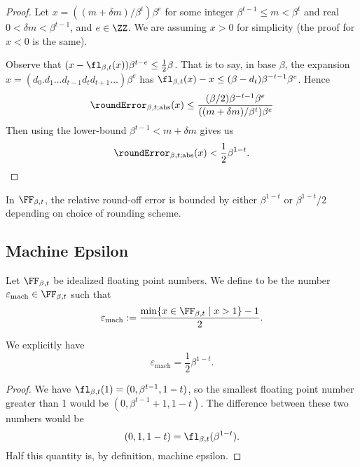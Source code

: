 \begin{proof}
Let $x=((m+\delta m)/\beta^{t})\beta^{e}$ for some integer $\beta^{t-1}\leq m<\beta^{t}$
and real $0<\delta m<\beta^{t-1}$, and $e\in\ZZ$. We are assuming $x>0$
for simplicity (the proof for $x<0$ is the same). 

Observe that $(x - \fl_{\beta,t}(x))\beta^{t-e}\leq \frac{1}{2}\beta$.
That is to say, in base $\beta$, the expansion $x = (d_{0}.d_{1}\dots d_{t-1}d_{t}d_{t+1}\dots)\beta^{e}$
has $\fl_{\beta,t}(x) - x\leq (\beta -d_{t})\beta^{-t-1}\beta^{e}$. Hence
\begin{equation}
  \roundError_{\beta,t;\text{abs}}(x)\leq
  \frac{(\beta/2)\beta^{-t-1}\beta^{e}}{((m+\delta m)/\beta^{t})\beta^{e}}
\end{equation}
Then using the lower-bound $\beta^{t-1}< m+\delta m$ gives us
\begin{equation*}
  \roundError_{\beta,t;\text{abs}}(x) < \frac{1}{2}\beta^{1-t}.\qedhere
\end{equation*}
\end{proof}


\begin{thm}
  In $\FF_{\beta,t}$, the relative round-off error is bounded by either
  $\beta^{1-t}$ or $\beta^{1-t}/2$ depending on choice of rounding scheme.
\end{thm}

\subsection{Machine Epsilon}

\begin{defn}
Let $\FF_{\beta,t}$ be idealized floating point numbers. We define
 to be the number
$\varepsilon_{\text{mach}}\in\FF_{\beta,t}$ such that
\begin{equation}
\varepsilon_{\text{mach}} := \frac{\min\{x\in\FF_{\beta,t}\mid x>1\}-1}{2}.
\end{equation}
\end{defn}

\begin{thm}
  We explicitly have
  \begin{equation}
    \varepsilon_{\text{mach}} = \frac{1}{2}\beta^{1-t}.
  \end{equation}
\end{thm}
\begin{proof}
  We have $\fl_{\beta,t}(1) = (0,\beta^{t-1},1-t)$, so the smallest
  floating point number greater than 1 would be $(0,\beta^{t-1}+1,1-t)$.
  The difference between these two numbers would be
  \begin{equation}
  (0,1,1-t)=\fl_{\beta,t}(\beta^{1-t}).
  \end{equation}
  Half this quantity is, by definition, machine epsilon.
\end{proof}

